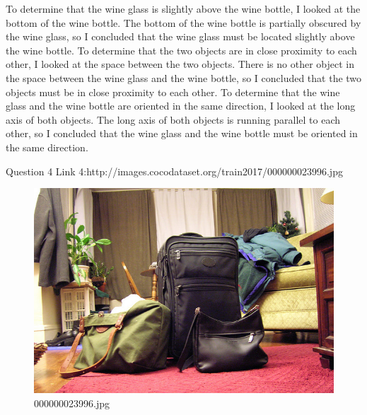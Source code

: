 \begin{enumerate}
{        To determine that the wine glass is slightly above the wine bottle, I looked at the bottom of the wine bottle. The bottom of the wine bottle is partially obscured by the wine glass, so I concluded that the wine glass must be located slightly above the wine bottle.
        To determine that the two objects are in close proximity to each other, I looked at the space between the two objects. There is no other object in the space between the wine glass and the wine bottle, so I concluded that the two objects must be in close proximity to each other.
        To determine that the wine glass and the wine bottle are oriented in the same direction, I looked at the long axis of both objects. The long axis of both objects is running parallel to each other, so I concluded that the wine glass and the wine bottle must be oriented in the same direction.}
    \end{enumerate}
Question 4
Link 4:http://images.cocodataset.org/train2017/000000023996.jpg
    \begin{figure}[h]
        \centering
        \includegraphics[width=0.8\linewidth]{../image set/easy/000000023996.jpg}
        \caption{000000023996.jpg}
    \end{figure}
